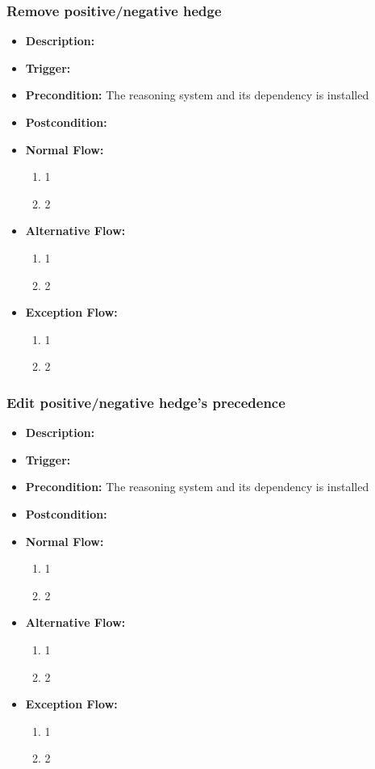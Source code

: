 \documentclass[../gr-final.tex]{subfiles}
\begin{document}
\subsubsection{Remove positive/negative hedge}
\begin{itemize}
  \item {\bfseries Description:} 
  \item {\bfseries Trigger:}
  \item {\bfseries Precondition:} The reasoning system and its
    dependency is installed
    
  \item {\bfseries Postcondition:}

  \item {\bfseries Normal Flow:}
    \begin{enumerate}
      \item 1
      \item 2
    \end{enumerate}
  \item {\bfseries Alternative Flow:}
    \begin{enumerate}
      \item 1
      \item 2
    \end{enumerate}
  \item {\bfseries Exception Flow:}
    \begin{enumerate}
      \item 1
      \item 2
    \end{enumerate}
\end{itemize}
\subsubsection{Edit positive/negative hedge's precedence}
\begin{itemize}
  \item {\bfseries Description:} 
  \item {\bfseries Trigger:}
  \item {\bfseries Precondition:} The reasoning system and its
    dependency is installed
    
  \item {\bfseries Postcondition:}

  \item {\bfseries Normal Flow:}
    \begin{enumerate}
      \item 1
      \item 2
    \end{enumerate}
  \item {\bfseries Alternative Flow:}
    \begin{enumerate}
      \item 1
      \item 2
    \end{enumerate}
  \item {\bfseries Exception Flow:}
    \begin{enumerate}
      \item 1
      \item 2
    \end{enumerate}
\end{itemize}
\end{document}
